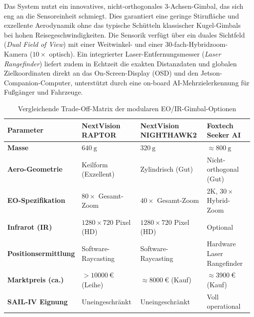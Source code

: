 \begin{enumerate}
                                                                                                 Das System nutzt ein innovatives, nicht-orthogonales 3-Achsen-Gimbal, das sich eng an die Sensoreinheit schmiegt. Dies garantiert eine geringe Stirnfläche 
                                                                                                 und exzellente Aerodynamik ohne das typische Schütteln klassischer Kugel-Gimbals bei hohen Reisegeschwindigkeiten. Die Sensorik verfügt über ein duales Sichtfeld
                                                                                                  (\textit{Dual Field of View}) mit einer Weitwinkel- und einer 30-fach-Hybridzoom-Kamera ($10\times$ optisch). Ein integrierter Laser-Entfernungsmesser 
                                                                                                  (\textit{Laser Rangefinder}) liefert zudem in Echtzeit die exakten Distanzdaten und globalen Zielkoordinaten direkt an das On-Screen-Display (OSD) 
                                                                                                  und den Jetson-Companion-Computer, unterstützt durch eine on-board AI-Mehrzielerkennung für Fußgänger und Fahrzeuge.
\end{enumerate}

\begin{table}[h!]
    \centering
    \caption{Vergleichende Trade-Off-Matrix der modularen EO/IR-Gimbal-Optionen}
    \vspace{0.2cm}
    \begin{tabular}{p{3.8cm} p{2.8cm} p{2.8cm} p{2.8cm}}
        \toprule
        \textbf{Parameter} & \textbf{NextVision RAPTOR} & \textbf{NextVision NIGHTHAWK2} & \textbf{Foxtech Seeker AI} \\
        \midrule
        \textbf{Masse} & $\SI{640}{\g}$ & $\SI{320}{\g}$ & $\approx \SI{800}{\g}$ \\
        \textbf{Aero-Geometrie} & Keilform (Exzellent) & Zylindrisch (Gut) & Nicht-orthogonal (Gut) \\
        \textbf{EO-Spezifikation} & $80\times$ Gesamt-Zoom & $40\times$ Gesamt-Zoom & 2K, $30\times$ Hybrid-Zoom \\
        \textbf{Infrarot (IR)} & $1280 \times 720$ Pixel (HD) & $1280 \times 720$ Pixel (HD) & Optional \\
        \textbf{Positionsermittlung} & Software-Raycasting & Software-Raycasting & Hardware Laser Rangefinder \\
        \textbf{Marktpreis (ca.)} & $> \SI{10000}{\text{€}}$ (Leihe) & $\approx \SI{8000}{\text{€}}$ (Kauf) & $\approx \SI{3900}{\text{€}}$ (Kauf) \\
        \textbf{SAIL-IV Eignung} & Uneingeschränkt & Uneingeschränkt & Voll operational \\
        \bottomrule
    \end{tabular}
    \label{tab:gimbal_trade_off}
\end{table}

